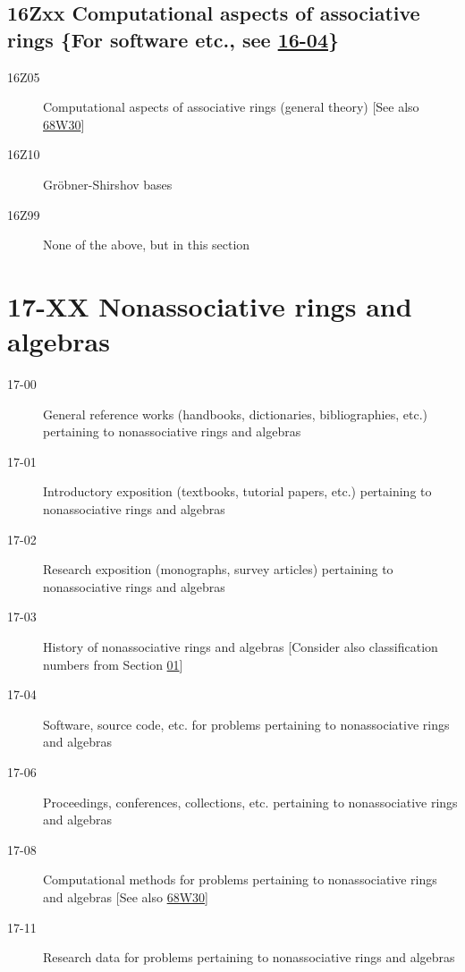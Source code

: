 \documentclass[letterpaper]{article}
\begin{document}
\subsection*{16Zxx  Computational aspects of associative rings \{For software etc., see \hyperref[16-04]{16-04}\} }\label{16Zxx}
\begin{description}  
\item [16Z05]\label{16Z05} Computational aspects of associative rings (general theory) [See also \hyperref[68W30]{68W30}]
\item [16Z10]\label{16Z10} Gr\"obner-Shirshov bases
\item [16Z99]\label{16Z99} None of the above, but in this section
\end{description}
\section*{17-XX  Nonassociative rings and algebras }\label{17-XX}
\begin{description}
\item [17-00]\label{17-00} General reference works (handbooks, dictionaries, bibliographies, etc.) pertaining to nonassociative rings and algebras
\item [17-01]\label{17-01} Introductory exposition (textbooks, tutorial papers, etc.) pertaining to nonassociative rings and algebras
\item [17-02]\label{17-02} Research exposition (monographs, survey articles) pertaining to nonassociative rings and algebras
\item [17-03]\label{17-03} History of nonassociative rings and algebras [Consider also classification numbers from Section \hyperref[01-XX]{01}]
\item [17-04]\label{17-04} Software, source code, etc. for problems pertaining to nonassociative rings and algebras
\item [17-06]\label{17-06} Proceedings, conferences, collections, etc. pertaining to nonassociative rings and algebras
\item [17-08]\label{17-08} Computational methods for problems pertaining to nonassociative rings and algebras [See also \hyperref[68W30]{68W30}]
\item [17-11]\label{17-11} Research data for problems pertaining to nonassociative rings and algebras
\end{description}
\end{document}
